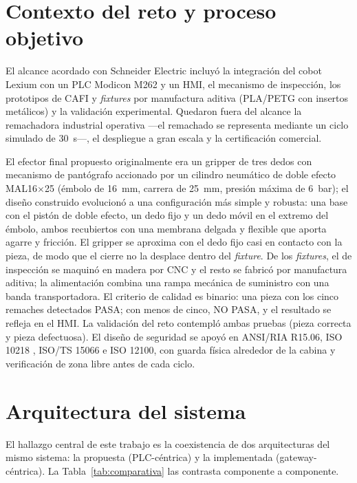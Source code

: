 \documentclass{styles/svproc}
\begin{document}
\section{Contexto del reto y proceso objetivo}
El alcance acordado con Schneider Electric incluyó la integración del cobot
Lexium con un PLC Modicon M262 \cite{modiconM262} y un HMI, el mecanismo de
inspección, los prototipos de CAFI y \emph{fixtures} por manufactura aditiva
(PLA/PETG con insertos metálicos) y la validación experimental. Quedaron
fuera del alcance la remachadora industrial operativa ---el remachado se
representa mediante un ciclo simulado de \SI{30}{\second}---, el despliegue a
gran escala y la certificación comercial.

El efector final propuesto originalmente era un gripper de tres dedos con
mecanismo de pantógrafo accionado por un cilindro neumático de doble efecto
MAL16$\times$25 (émbolo de \SI{16}{\milli\metre}, carrera de
\SI{25}{\milli\metre}, presión máxima de \SI{6}{\bar}); el diseño construido
evolucionó a una configuración más simple y robusta: una base con el pistón
de doble efecto, un dedo fijo y un dedo móvil en el extremo del émbolo,
ambos recubiertos con una membrana delgada y flexible que aporta agarre y
fricción. El gripper se aproxima con el dedo fijo casi en contacto con la
pieza, de modo que el cierre no la desplace dentro del \emph{fixture}. De
los \emph{fixtures}, el de inspección se maquinó en madera por CNC y el
resto se fabricó por manufactura aditiva; la alimentación combina una rampa
mecánica de suministro con una banda transportadora. El criterio de calidad
es binario: una pieza con los cinco remaches detectados
PASA; con menos de cinco, NO PASA, y el resultado se refleja en el HMI. La
validación del reto contempló ambas pruebas (pieza correcta y pieza
defectuosa). El diseño de seguridad se apoyó en ANSI/RIA R15.06,
ISO 10218 \cite{iso10218-1,iso10218-2}, ISO/TS 15066 \cite{isots15066} e
ISO 12100,
con guarda física alrededor de la cabina y verificación de zona libre antes
de cada ciclo.

\section{Arquitectura del sistema}
El hallazgo central de este trabajo es la coexistencia de dos arquitecturas
del mismo sistema: la propuesta (PLC-céntrica) y la implementada
(gateway-céntrica). La Tabla~\ref{tab:comparativa} las contrasta componente
a componente.
\end{document}
